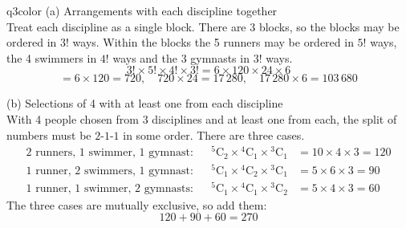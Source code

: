 \documentclass[11pt,a4paper]{article}
\newcommand{\ncr}[2]{{}^{#1}\mathrm{C}_{#2}}
\begin{document}
\begin{ansbox}{q3color}
(a) Arrangements with each discipline together\\[4pt]
Treat each discipline as a single block. There are 3 blocks, so the blocks may be ordered in $3!$ ways. Within the blocks the 5 runners may be ordered in $5!$ ways, the 4 swimmers in $4!$ ways and the 3 gymnasts in $3!$ ways.
\[
3! \times 5! \times 4! \times 3! = 6 \times 120 \times 24 \times 6
\]
\[
= 6 \times 120 = 720, \quad 720 \times 24 = 17\,280, \quad 17\,280 \times 6 = \boxed{103\,680}
\]

(b) Selections of 4 with at least one from each discipline\\[4pt]
With 4 people chosen from 3 disciplines and at least one from each, the split of numbers must be $2$-$1$-$1$ in some order. There are three cases.
\begin{align*}
\text{2 runners, 1 swimmer, 1 gymnast:} && \ncr{5}{2} \times \ncr{4}{1} \times \ncr{3}{1} &= 10 \times 4 \times 3 = 120\\
\text{1 runner, 2 swimmers, 1 gymnast:} && \ncr{5}{1} \times \ncr{4}{2} \times \ncr{3}{1} &= 5 \times 6 \times 3 = 90\\
\text{1 runner, 1 swimmer, 2 gymnasts:} && \ncr{5}{1} \times \ncr{4}{1} \times \ncr{3}{2} &= 5 \times 4 \times 3 = 60
\end{align*}
The three cases are mutually exclusive, so add them:
\[
120 + 90 + 60 = \boxed{270}
\]
\end{ansbox}
\end{document}
